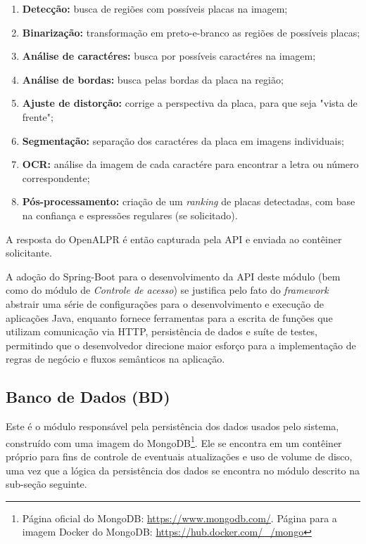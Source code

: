 \documentclass[12pt]{article}
\begin{document}
\begin{enumerate}
	\item \textbf{Detecção:} busca de regiões com possíveis placas na imagem;
	\item \textbf{Binarização:} transformação em preto-e-branco as regiões de possíveis placas;
	\item \textbf{Análise de caractéres:} busca por possíveis caractéres na imagem;
	\item \textbf{Análise de bordas:} busca pelas bordas da placa na região;
	\item \textbf{Ajuste de distorção:} corrige a perspectiva da placa, para que seja "vista de frente";
	\item \textbf{Segmentação:} separação dos caractéres da placa em imagens individuais;
	\item \textbf{OCR:} análise da imagem de cada caractére para encontrar a letra ou número correspondente;
	\item \textbf{Pós-processamento:} criação de um \textit{ranking} de placas detectadas, com base na confiança e espressões regulares (se solicitado).
\end{enumerate}

A resposta do OpenALPR é então capturada pela API e enviada ao contêiner solicitante.

A adoção do Spring-Boot para o desenvolvimento da API deste módulo (bem como do módulo de \textit{Controle de acesso}) se justifica pelo fato do \textit{framework} abstrair uma série de configurações para o desenvolvimento e execução de aplicações Java, enquanto fornece ferramentas para a escrita de funções que utilizam comunicação via HTTP, persistência de dados e suíte de testes, permitindo que o desenvolvedor direcione maior esforço para a implementação de regras de negócio e fluxos semânticos na aplicação.

\subsection{Banco de Dados (BD)}

Este é o módulo responsável pela persistência dos dados usados pelo sistema, construído com uma imagem do MongoDB\footnote{Página oficial do MongoDB: \url{https://www.mongodb.com/}. Página para a imagem Docker do MongoDB: \url{https://hub.docker.com/_/mongo}}. Ele se encontra em um contêiner próprio para fins de controle de eventuais atualizações e uso de volume de disco, uma vez que a lógica da persistência dos dados se encontra no módulo descrito na sub-seção seguinte.
\end{document}
